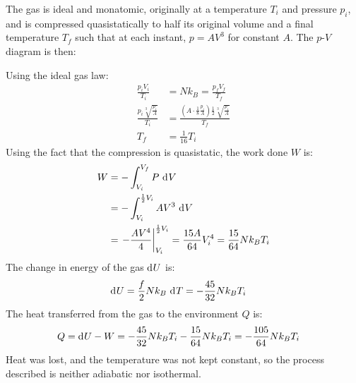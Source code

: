 \documentclass{article}
\begin{document}
\clearpage

The gas is ideal and monatomic, originally at a temperature $T_i$ and pressure $p_i$, and is compressed quasistatically to half its original volume and a final temperature $T_f$ such that at each instant, $p = AV^3$ for constant $A$. The $p$-$V$ diagram is then:
\begin{center}
\end{center}
Using the ideal gas law:
\begin{equation}
    \begin{split}
        \frac{p_iV_i}{T_i} & = Nk_B = \frac{p_fV_f}{T_f} \\
        \frac{p_i\sqrt[3]{\frac{p_i}{A}}}{T_i} & = \frac{(A \cdot \frac{1}{8}\frac{p_i}{A})\frac{1}{2}\sqrt[3]{\frac{p_i}{A}}}{T_f} \\
        T_f & = \frac{1}{16}T_i
    \end{split}
\end{equation}
Using the fact that the compression is quasistatic, the work done $W$ is:
\begin{equation}
    \begin{split}
        W & = -\int_{V_i}^{V_f} P \, \diff{V} \\
        & = -\int_{V_i}^{\frac{1}{2}V_i} AV^3 \, \diff{V} \\
        & = \left.-\frac{AV^4}{4}\right\vert_{V_i}^{\frac{1}{2}V_i} = \frac{15A}{64}V_i^4 = \frac{15}{64}Nk_B T_i
    \end{split}
\end{equation}
The change in energy of the gas $\diff{U}$ is:
\begin{equation}
    \begin{split}
        \diff{U} & = \frac{f}{2}Nk_B \, \diff{T} = -\frac{45}{32}Nk_B T_i
    \end{split}
\end{equation}
The heat transferred from the gas to the environment $Q$ is:
\begin{equation}
    \begin{split}
        Q = \diff{U} - W & = -\frac{45}{32}Nk_B T_i - \frac{15}{64}Nk_B T_i = -\frac{105}{64}Nk_B T_i
    \end{split}
\end{equation}
Heat was lost, and the temperature was not kept constant, so the process described is neither adiabatic nor isothermal.
\end{document}
